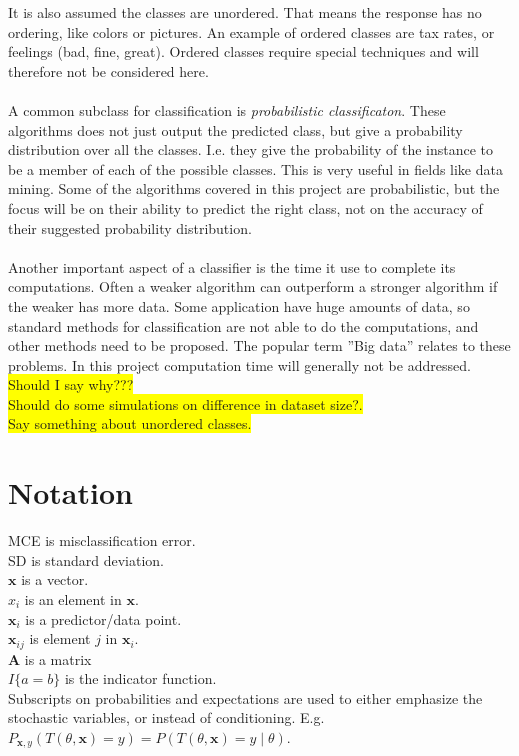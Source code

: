 It is also assumed the classes are unordered. That means the response has no ordering, like colors or pictures. An example of ordered classes are tax rates, or feelings (bad, fine, great). Ordered classes require special techniques and will therefore not be considered here. 
\\
\\
A common subclass for classification is \textit{probabilistic classificaton}. These algorithms does not just output the predicted class, but give a probability distribution over all the classes. I.e. they give the probability of the instance to be a member of each of the possible classes. This is very useful in fields like data mining. 
Some of the algorithms covered in this project are probabilistic, but the focus will be on their ability to predict the right class, not on the accuracy of their suggested probability distribution.
\\
\\
Another important aspect of a classifier is the time it use to complete its computations. Often a weaker algorithm can outperform a stronger algorithm if the weaker has more data. Some application have huge amounts of data, so standard methods for classification are not able to do the computations, and other methods need to be proposed. The popular term ''Big data'' relates to these problems. In this project computation time will generally not be addressed. \colorbox{yellow}{Should I say why???}
\\

\colorbox{yellow}{Should do some simulations on difference in dataset size?.}\\
\colorbox{yellow}{Say something about unordered classes.}


\section{Notation}
\label{sec:Notation}
MCE is misclassification error. \\
SD is standard deviation. \\
$\mathbf{x}$ is a vector. \\
$x_i$ is an element in $\mathbf{x}$. \\
$\mathbf{x}_i$ is a predictor/data point.  \\
$\mathbf{x}_{ij}$ is element $j$ in $\mathbf{x}_i$. \\
$\mathbf{A}$ is a matrix \\
$I\{a = b\}$ is the indicator function.\\
Subscripts on probabilities and expectations are used to either emphasize the stochastic variables, or instead of conditioning. 
E.g. $P_{\mathbf{x}, y}(T(\theta, \mathbf{x}) = y) = P(T(\theta, \mathbf{x}) = y \mid \theta)$.

